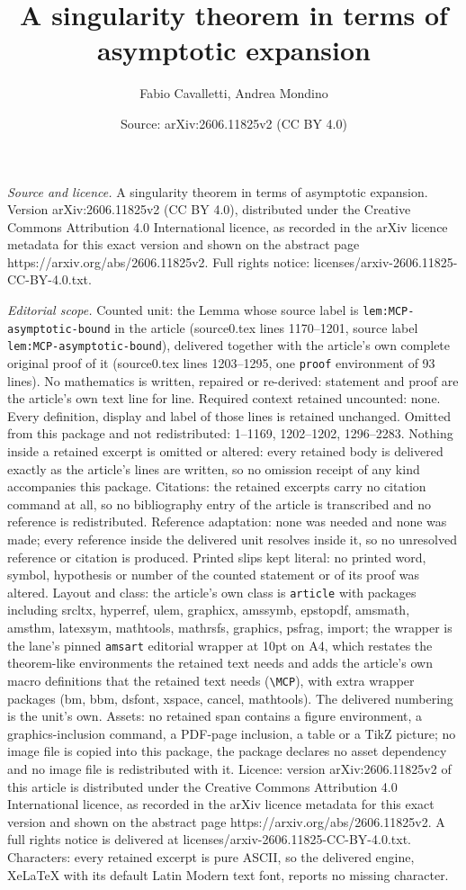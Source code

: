 \documentclass[10pt,a4paper]{amsart}
\title[A singularity theorem in terms of asymptotic expansion]{A singularity theorem in terms of asymptotic expansion}
\author{Fabio Cavalletti, Andrea Mondino}
\date{Source: arXiv:2606.11825v2 (CC BY 4.0)}
\begin{document}
\maketitle

\noindent\emph{Source and licence.} A singularity theorem in terms of asymptotic expansion. Version arXiv:2606.11825v2 (CC BY 4.0), distributed under the Creative Commons Attribution 4.0 International licence, as recorded in the arXiv licence metadata for this exact version and shown on the abstract page https://arxiv.org/abs/2606.11825v2. Full rights notice: licenses/arxiv-2606.11825-CC-BY-4.0.txt.\par\smallskip

\noindent\textit{Editorial scope.} Counted unit: the Lemma whose source label is \texttt{lem:MCP-asymptotic-bound} in the article (source0.tex lines 1170--1201, source label \texttt{lem:MCP-asymptotic-bound}), delivered together with the article's own complete original proof of it (source0.tex lines 1203--1295, one \texttt{proof} environment of 93 lines). No mathematics is written, repaired or re-derived: statement and proof are the article's own text line for line. Required context retained uncounted: none. Every definition, display and label of those lines is retained unchanged. Omitted from this package and not redistributed: 1--1169, 1202--1202, 1296--2283. Nothing inside a retained excerpt is omitted or altered: every retained body is delivered exactly as the article's lines are written, so no omission receipt of any kind accompanies this package. Citations: the retained excerpts carry no citation command at all, so no bibliography entry of the article is transcribed and no reference is redistributed. Reference adaptation: none was needed and none was made; every reference inside the delivered unit resolves inside it, so no unresolved reference or citation is produced. Printed slips kept literal: no printed word, symbol, hypothesis or number of the counted statement or of its proof was altered. Layout and class: the article's own class is \texttt{article} with packages including srcltx, hyperref, ulem, graphicx, amssymb, epstopdf, amsmath, amsthm, latexsym, mathtools, mathrsfs, graphics, psfrag, import; the wrapper is the lane's pinned \texttt{amsart} editorial wrapper at 10pt on A4, which restates the theorem-like environments the retained text needs and adds the article's own macro definitions that the retained text needs (\texttt{\textbackslash MCP}), with extra wrapper packages (bm, bbm, dsfont, xspace, cancel, mathtools). The delivered numbering is the unit's own. Assets: no retained span contains a figure environment, a graphics-inclusion command, a PDF-page inclusion, a table or a TikZ picture; no image file is copied into this package, the package declares no asset dependency and no image file is redistributed with it. Licence: version arXiv:2606.11825v2 of this article is distributed under the Creative Commons Attribution 4.0 International licence, as recorded in the arXiv licence metadata for this exact version and shown on the abstract page https://arxiv.org/abs/2606.11825v2. A full rights notice is delivered at licenses/arxiv-2606.11825-CC-BY-4.0.txt. Characters: every retained excerpt is pure ASCII, so the delivered engine, XeLaTeX with its default Latin Modern text font, reports no missing character.
\end{document}
